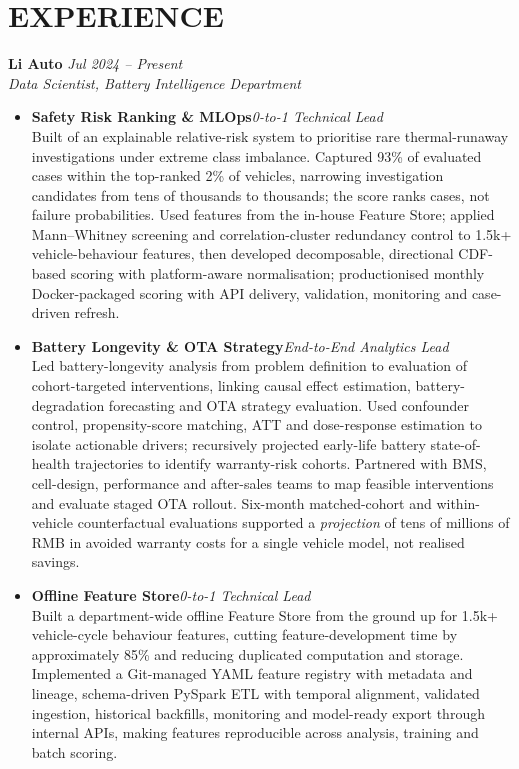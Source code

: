 \documentclass[a4paper,10pt]{article}
\begin{document}
\section{EXPERIENCE}
\textbf{Li Auto} \hfill \textit{Jul 2024 -- Present}\\
\textit{Data Scientist, Battery Intelligence Department}
\begin{itemize}
\item \textbf{Safety Risk Ranking \& MLOps}\hfill{\small\textit{0-to-1 Technical Lead}}\\[-1pt] Built of an explainable relative-risk system to prioritise rare thermal-runaway investigations under extreme class imbalance. Captured 93\% of evaluated cases within the top-ranked 2\% of vehicles, narrowing investigation candidates from tens of thousands to thousands; the score ranks cases, not failure probabilities. Used features from the in-house Feature Store; applied Mann--Whitney screening and correlation-cluster redundancy control to 1.5k+ vehicle-behaviour features, then developed decomposable, directional CDF-based scoring with platform-aware normalisation; productionised monthly Docker-packaged scoring with API delivery, validation, monitoring and case-driven refresh.
\item \textbf{Battery Longevity \& OTA Strategy}\hfill{\small\textit{End-to-End Analytics Lead}}\\[-1pt] Led battery-longevity analysis from problem definition to evaluation of cohort-targeted interventions, linking causal effect estimation, battery-degradation forecasting and OTA strategy evaluation. Used confounder control, propensity-score matching, ATT and dose-response estimation to isolate actionable drivers; recursively projected early-life battery state-of-health trajectories to identify warranty-risk cohorts. Partnered with BMS, cell-design, performance and after-sales teams to map feasible interventions and evaluate staged OTA rollout. Six-month matched-cohort and within-vehicle counterfactual evaluations supported a \emph{projection} of tens of millions of RMB in avoided warranty costs for a single vehicle model, not realised savings.
\item \textbf{Offline Feature Store}\hfill{\small\textit{0-to-1 Technical Lead}}\\[-1pt] Built a department-wide offline Feature Store from the ground up for 1.5k+ vehicle-cycle behaviour features, cutting feature-development time by approximately 85\% and reducing duplicated computation and storage. Implemented a Git-managed YAML feature registry with metadata and lineage, schema-driven PySpark ETL with temporal alignment, validated ingestion, historical backfills, monitoring and model-ready export through internal APIs, making features reproducible across analysis, training and batch scoring.

\end{itemize}
\end{document}
